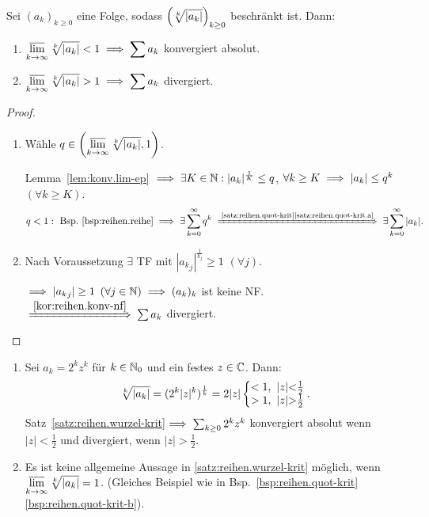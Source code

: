 \documentclass[12pt]{scrreprt}
\begin{document}
\begin{satz}[Wurzelkriterium]
  \label{satz:reihen.wurzel-krit}
  Sei $(a_k)_{k\geq 0}$ eine Folge, sodass $\left(\sqrt[k]{\left\lvert a_k\right\lvert}\right)_{k\geq 0}$ beschränkt ist. Dann:
  \begin{enumerate}%
    \item \label{satz:reihen.wurzel-krit.a} $\displaystyle\varlimsup_{k\rightarrow\infty}\sqrt[k]{\left\lvert a_k\right\lvert} <1\implies\sum a_k$ konvergiert absolut.
    \item \label{satz:reihen.wurzel-krit.b} $\displaystyle\varlimsup_{k\rightarrow\infty}\sqrt[k]{\left\lvert a_k\right\lvert} >1\implies\sum a_k$ divergiert.
  \end{enumerate}
\end{satz}

\begin{proof}\begin{enumerate}%
  \item Wähle $\displaystyle q\in\left(\varlimsup_{k\rightarrow\infty}\sqrt[k]{\left\lvert a_k\right\lvert}, 1\right)$.
  
  Lemma~\ref{lem:konv.lim-ep} $\implies\exists K\in\mathbb{N}: |a_k|^{\frac{1}{K}} \leq q$, $\forall k\geq K\implies |a_k|\leq q^k$ $(\forall k\geq K)$.
  \[q<1: \text{ Bsp.~\ref{bsp:reihen.reihe}}\folgt\exists\sum^\infty_{k=0}q^k\folgtwegen{\text{\ref{satz:reihen.quot-krit}\ref{satz:reihen.quot-krit.a}}}\exists\sum^\infty_{k=0}|a_k|.\]
  \item Nach Voraussetzung $\exists$ TF mit $|{a_k}_j|^{\frac{1}{k_j}}\geq 1$ $(\forall j)$.
  
  $\implies|{a_k}_j|\geq 1$ $(\forall j\in\mathbb{N})\implies(a_k)_k$ ist keine NF. $\folgtwegen{\ref{kor:reihen.konv-nf}}\sum a_k$ divergiert.
\end{enumerate}\end{proof}

\begin{bsp}
  \label{bsp:reihen.wurzel-krit}
  \begin{enumerate}%
  \item Sei $a_k = 2^kz^k$ für $k\in\mathbb{N}_0$ und ein festes $z\in\mathbb{C}$. Dann:
  \[\sqrt[k]{\abs{a_k}}=(2^k|z|^k)^\frac{1}{k}=2|z|\left\{\begin{array}{@{} l @{,\ |z|} c @{\frac{1}{2}}}<1&<\\>1&>\end{array}\right..\]
  Satz~\ref{satz:reihen.wurzel-krit}$\implies\sum_{k\geq 0}2^kz^k$ konvergiert absolut wenn $|z|<\frac{1}{2}$ und divergiert, wenn $|z|>\frac{1}{2}$.
  \item Es ist keine allgemeine Aussage in \ref{satz:reihen.wurzel-krit} möglich, wenn $\displaystyle\varlimsup_{k\rightarrow\infty}\sqrt[k]{\left\lvert a_k\right\lvert}=1$. (Gleiches Beispiel wie in Bsp.~\ref{bsp:reihen.quot-krit}\ref{bsp:reihen.quot-krit-b}).
  \end{enumerate}
\end{bsp}
\end{document}
